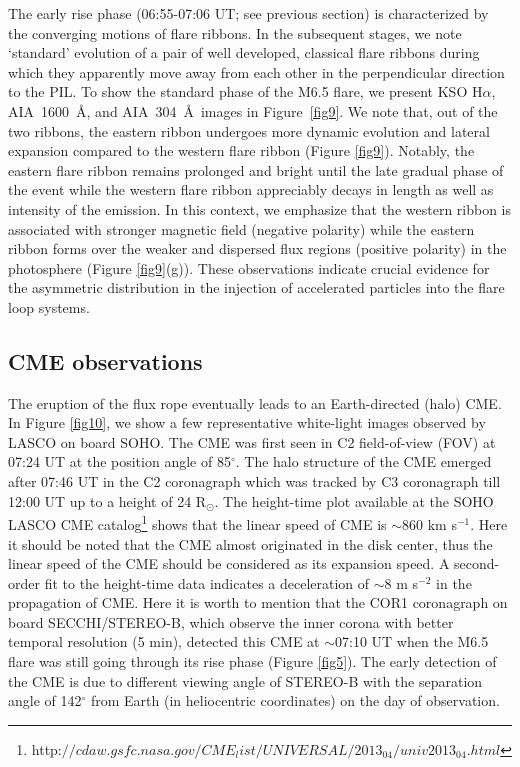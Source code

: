 \documentclass[twocolumn]{aastex6}
\begin{document}
The early rise phase (06:55-07:06 UT; see previous section) is characterized by the converging motions of flare ribbons. In the subsequent stages, we note `standard' evolution of a pair of well developed, classical flare ribbons during which they apparently move away from each other in the perpendicular direction to the PIL. To show the standard phase of the M6.5 flare, we present KSO H$\alpha$, AIA~1600~\AA, and AIA~304~\AA~images in Figure~\ref{fig9}. We note that, out of the two ribbons, the eastern ribbon undergoes more dynamic evolution and lateral expansion compared to the western flare ribbon (Figure \ref{fig9}). Notably, the eastern flare ribbon remains prolonged and bright until the late gradual phase of the event while the western flare ribbon appreciably decays in length as well as intensity of the emission. In this context, we emphasize that the western ribbon is associated with stronger magnetic field (negative polarity) while the eastern ribbon forms over the weaker and dispersed flux regions (positive polarity) in the photosphere (Figure \ref{fig9}(g)). These observations indicate crucial evidence for the asymmetric distribution in the injection of accelerated particles into the flare loop systems.
     
\subsection{CME observations}

\begin{figure*}
\caption{Running difference images derived from LASCO C2 and C3 showing the propagation of the CME associated with the M6.5 flare.}
\label{fig10}
\end{figure*} 

The eruption of the flux rope eventually leads to an Earth-directed (halo) CME. In Figure \ref{fig10}, we show a few representative white-light images observed by LASCO on board SOHO. The CME was first seen in C2  field-of-view (FOV) at 07:24 UT at the position angle of 85$^\circ$. The halo structure of the CME emerged after 07:46 UT in the C2 coronagraph which was tracked by C3 coronagraph till 12:00 UT up to a height of 24 R$ _{\odot} $. The height-time plot available at the SOHO LASCO CME catalog\footnote{http:$//cdaw.gsfc.nasa.gov/CME_list/UNIVERSAL/2013_04/univ2013_04.html$} shows that the linear speed of CME is $ \sim $860 km s$ ^{-1} $. Here it should be noted that the CME almost originated in the disk center, thus the linear speed of the CME should be considered as its expansion speed.  A second-order fit to the height-time data indicates a deceleration of $ \sim $8 m s$^{-2}$ in the propagation of CME. Here it is worth to mention that the COR1 coronagraph on board SECCHI/STEREO-B, which observe the inner corona \citep[1.5--4~R$_{\odot}$;][]{Howard2008} with better temporal resolution (5 min), detected this CME at $ \sim $07:10 UT when the M6.5 flare was still going through its rise phase (Figure \ref{fig5}). The early detection of the CME is due to different viewing angle of STEREO-B with the separation angle of 142$^{\circ}$ from Earth (in heliocentric coordinates) on the day of observation.
\end{document}
